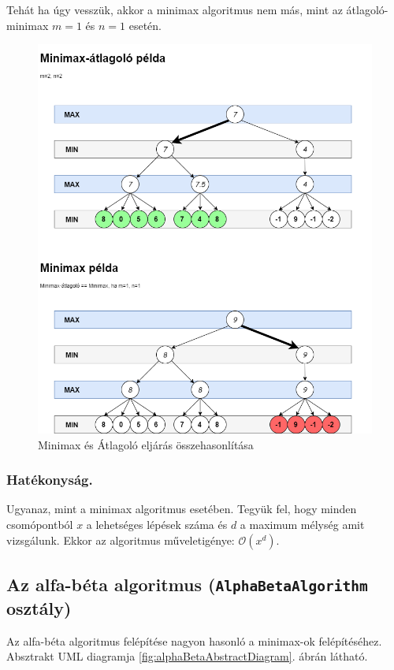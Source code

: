 \documentclass[twoside, a4paper, 12pt]{book}
\begin{document}
Tehát ha úgy vesszük, akkor a minimax algoritmus nem más, mint az átlagoló-minimax $m=1$ és $n=1$ esetén.

\begin{figure}[htbp]
	\centering
	\includegraphics[width=\textwidth]{img/minimaxVsAverageExample.png}
	\caption{Minimax és Átlagoló eljárás összehasonlítása\cite{bevMiHu}}
	\label{fig:minimaxVsAverageExample}
\end{figure}
\subsubsection*{Hatékonyság.} Ugyanaz, mint a minimax algoritmus esetében. Tegyük fel, hogy minden csomópontból $x$ a lehetséges lépések száma és $d$ a maximum mélység amit vizsgálunk. Ekkor az algoritmus műveletigénye: $ \mathcal{O}(x^d)$.\cite{alfaBetaPruneHu}

\subsection{Az alfa-béta algoritmus (\texttt{AlphaBetaAlgorithm} osztály)}
Az alfa-béta algoritmus felépítése nagyon hasonló a minimax-ok felépítéséhez. Absztrakt UML diagramja \ref{fig:alphaBetaAbstractDiagram}. ábrán látható.
\end{document}
